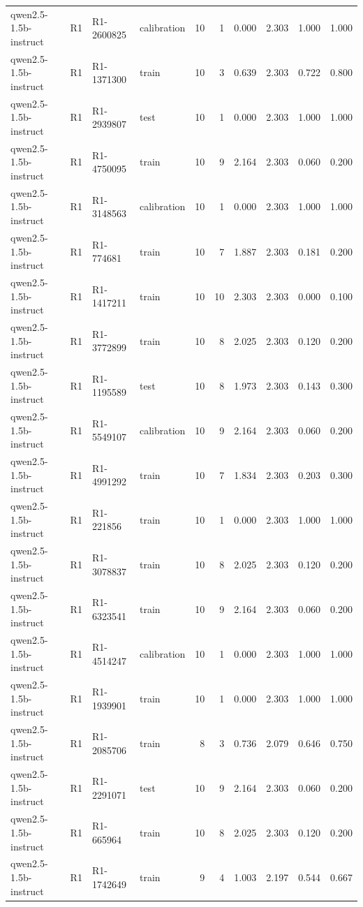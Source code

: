 \begin{table}
\begin{tabular}{llllrrrrrr}
qwen2.5-1.5b-instruct & R1 & R1-2600825 & calibration & 10 & 1 & 0.000 & 2.303 & 1.000 & 1.000 \\
qwen2.5-1.5b-instruct & R1 & R1-1371300 & train & 10 & 3 & 0.639 & 2.303 & 0.722 & 0.800 \\
qwen2.5-1.5b-instruct & R1 & R1-2939807 & test & 10 & 1 & 0.000 & 2.303 & 1.000 & 1.000 \\
qwen2.5-1.5b-instruct & R1 & R1-4750095 & train & 10 & 9 & 2.164 & 2.303 & 0.060 & 0.200 \\
qwen2.5-1.5b-instruct & R1 & R1-3148563 & calibration & 10 & 1 & 0.000 & 2.303 & 1.000 & 1.000 \\
qwen2.5-1.5b-instruct & R1 & R1-774681 & train & 10 & 7 & 1.887 & 2.303 & 0.181 & 0.200 \\
qwen2.5-1.5b-instruct & R1 & R1-1417211 & train & 10 & 10 & 2.303 & 2.303 & 0.000 & 0.100 \\
qwen2.5-1.5b-instruct & R1 & R1-3772899 & train & 10 & 8 & 2.025 & 2.303 & 0.120 & 0.200 \\
qwen2.5-1.5b-instruct & R1 & R1-1195589 & test & 10 & 8 & 1.973 & 2.303 & 0.143 & 0.300 \\
qwen2.5-1.5b-instruct & R1 & R1-5549107 & calibration & 10 & 9 & 2.164 & 2.303 & 0.060 & 0.200 \\
qwen2.5-1.5b-instruct & R1 & R1-4991292 & train & 10 & 7 & 1.834 & 2.303 & 0.203 & 0.300 \\
qwen2.5-1.5b-instruct & R1 & R1-221856 & train & 10 & 1 & 0.000 & 2.303 & 1.000 & 1.000 \\
qwen2.5-1.5b-instruct & R1 & R1-3078837 & train & 10 & 8 & 2.025 & 2.303 & 0.120 & 0.200 \\
qwen2.5-1.5b-instruct & R1 & R1-6323541 & train & 10 & 9 & 2.164 & 2.303 & 0.060 & 0.200 \\
qwen2.5-1.5b-instruct & R1 & R1-4514247 & calibration & 10 & 1 & 0.000 & 2.303 & 1.000 & 1.000 \\
qwen2.5-1.5b-instruct & R1 & R1-1939901 & train & 10 & 1 & 0.000 & 2.303 & 1.000 & 1.000 \\
qwen2.5-1.5b-instruct & R1 & R1-2085706 & train & 8 & 3 & 0.736 & 2.079 & 0.646 & 0.750 \\
qwen2.5-1.5b-instruct & R1 & R1-2291071 & test & 10 & 9 & 2.164 & 2.303 & 0.060 & 0.200 \\
qwen2.5-1.5b-instruct & R1 & R1-665964 & train & 10 & 8 & 2.025 & 2.303 & 0.120 & 0.200 \\
qwen2.5-1.5b-instruct & R1 & R1-1742649 & train & 9 & 4 & 1.003 & 2.197 & 0.544 & 0.667 \\

\end{tabular}
\end{table}
